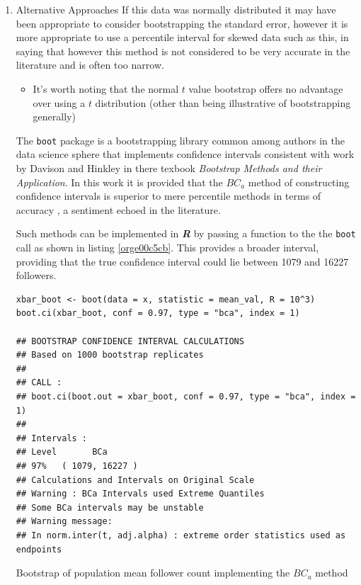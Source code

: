 \documentclass[11pt]{article}
\begin{document}
\begin{enumerate}
\item Alternative Approaches
\label{sec:orgbd9d114}
If this data was normally distributed it may have been appropriate to consider
bootstrapping the standard error, however it is more appropriate to use a
percentile interval for skewed data such as this, in saying that however this method is not considered to be very accurate in the literature and is often too narrow. \cite[Section 4.1]{hesterberg2015}

\begin{itemize}
\item It's worth noting that the normal \(t\) value bootstrap offers no advantage over
using a \(t\) distribution (other than being illustrative of bootstrapping
generally) \cite[Section 4.1]{hesterberg2015}
\end{itemize}


 The \texttt{boot} package is a bootstrapping library common among authors in the data science sphere
 \cite[p. 295]{james2013} \cite[p. 237]{wiley2019} that implements
 confidence intervals consistent with work by Davison and Hinkley
 \cite{ripley2020} in there texbook \emph{Bootstrap Methods and their Application}.
In this work it is provided that the \(BC_{a}\) method of constructing confidence
 intervals is  superior to mere percentile
 methods in terms of accuracy \cite[Ch. 5]{davison1997}, a sentiment echoed in the literature. \cite[Ch. 5]{carpenter2000,davison1997}

Such methods can be implemented in \textbf{\emph{R}} by passing a function to the the \texttt{boot} call as shown in listing \ref{orge00c5cb}. This provides a broader interval, providing that the true confidence interval could lie between 1079 and 16227 followers.

\begin{listing}[htbp]
\begin{verbatim}
xbar_boot <- boot(data = x, statistic = mean_val, R = 10^3)
boot.ci(xbar_boot, conf = 0.97, type = "bca", index = 1)

## BOOTSTRAP CONFIDENCE INTERVAL CALCULATIONS
## Based on 1000 bootstrap replicates
##
## CALL :
## boot.ci(boot.out = xbar_boot, conf = 0.97, type = "bca", index = 1)
##
## Intervals :
## Level       BCa
## 97%   ( 1079, 16227 )
## Calculations and Intervals on Original Scale
## Warning : BCa Intervals used Extreme Quantiles
## Some BCa intervals may be unstable
## Warning message:
## In norm.inter(t, adj.alpha) : extreme order statistics used as endpoints
\end{verbatim}
\caption{\label{orge00c5cb}Bootstrap of population mean follower count implementing the \(BC_{a}\) method}
\end{listing}

\label{org1090609}


\label{org4299e1e}
 
\end{enumerate}
\end{document}
